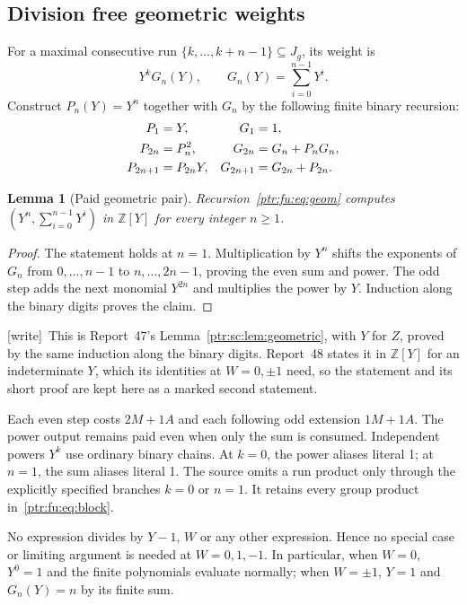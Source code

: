 \documentclass[11pt,letterpaper]{article}
\newtheorem{lemma}[theorem]{Lemma}
\theoremstyle{definition}\newtheorem{definition}[theorem]{Definition}
\theoremstyle{remark}\newtheorem{remark}[theorem]{Remark}
\newcommand{\Z}{\mathbb Z}\newcommand{\N}{\mathbb N}\newcommand{\Zp}{\mathbb Z_{>0}}
\newcommand{\wtag}{\textup{[write]}}
\begin{document}
\subsection{Division free geometric weights}
For a maximal consecutive run $\{k,\ldots,k+n-1\}\subseteq J_g$, its weight is
\[
 Y^kG_n(Y),\qquad G_n(Y)=\sum_{i=0}^{n-1}Y^i.
\]
Construct $P_n(Y)=Y^n$ together with $G_n$ by the following finite binary recursion:
\begin{align}
 P_1&=Y,&G_1&=1,\notag\\
 P_{2n}&=P_n^2,&G_{2n}&=G_n+P_nG_n,\label{ptr:fu:eq:geom}\\
 P_{2n+1}&=P_{2n}Y,&G_{2n+1}&=G_{2n}+P_{2n}.\notag
\end{align}
\begin{lemma}[Paid geometric pair]\label{ptr:fu:lem:geom}
Recursion~\eqref{ptr:fu:eq:geom} computes $(Y^n,\sum_{i=0}^{n-1}Y^i)$ in $\Z[Y]$ for every integer $n\ge1$.
\end{lemma}
\begin{proof}
The statement holds at $n=1$. Multiplication by $Y^n$ shifts the exponents of $G_n$ from $0,\ldots,n-1$ to $n,\ldots,2n-1$, proving the even sum and power. The odd step adds the next monomial $Y^{2n}$ and multiplies the power by $Y$. Induction along the binary digits proves the claim.
\end{proof}
{\small\wtag\ This is Report~47's Lemma~\ref{ptr:sc:lem:geometric}, with $Y$
for $Z$, proved by the same induction along the binary digits. Report~48
states it in $\Z[Y]$ for an indeterminate $Y$, which its identities at
$W=0,\pm1$ need, so the statement and its short proof are kept here as a
marked second statement.\par}
Each even step costs $2M+1A$ and each following odd extension $1M+1A$. The power output remains paid even when only the sum is consumed. Independent powers $Y^k$ use ordinary binary chains. At $k=0$, the power aliases literal 1; at $n=1$, the sum aliases literal 1. The source omits a run product only through the explicitly specified branches $k=0$ or $n=1$. It retains every group product in~\eqref{ptr:fu:eq:block}.

No expression divides by $Y-1$, $W$ or any other expression. Hence no special case or limiting argument is needed at $W=0,1,-1$. In particular, when $W=0$, $Y^0=1$ and the finite polynomials evaluate normally; when $W=\pm1$, $Y=1$ and $G_n(Y)=n$ by its finite sum.
\end{document}
